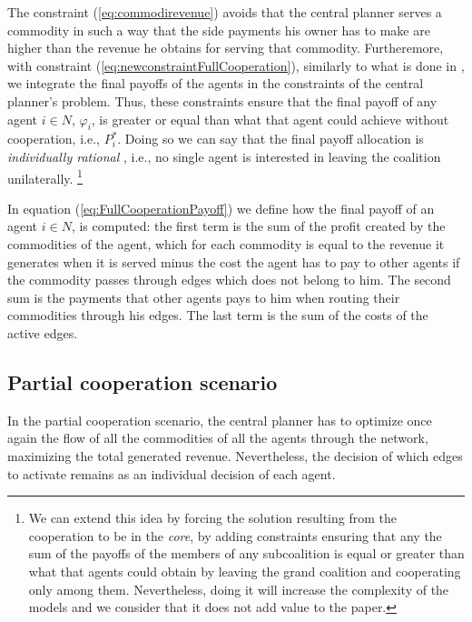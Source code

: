\documentclass[review]{elsarticle}
\begin{document}
\begin{enumerate}[(a)]
The constraint (\ref{eq:commodirevenue}) avoids that the central planner serves a commodity in such a way that the side payments his owner has to make are higher than the revenue he obtains for serving that commodity. Furtheremore, with constraint (\ref{eq:newconstraintFullCooperation}), similarly to what is done in \cite{VANOVERMEIRE2014125}, we integrate the final payoffs of the agents in the constraints of the central planner's problem. Thus, these constraints  ensure that the final payoff of any agent $i\in N$, $\varphi_i$, is greater or equal than what that agent could achieve without cooperation, i.e., $P_i^*$.  Doing so we can say that the final payoff allocation is \emph{individually rational} \cite{GONZALEZ2010}, i.e., no single agent is interested in leaving the coalition unilaterally.  \footnote{We can extend this idea by forcing the solution resulting from the cooperation to be in the \emph{core}, by adding constraints ensuring that any the sum of the payoffs of the members of any subcoalition is equal or greater than what that agents could obtain by leaving the grand coalition and cooperating only among them. Nevertheless, doing it will increase the complexity of the models and we consider that it does not add value to the paper.}
	


\end{enumerate}


In equation (\ref{eq:FullCooperationPayoff}) we define how the final payoff of an agent $i\in N$, is computed: the first term is the sum of the profit created by the commodities of the agent, which for each commodity is equal to the revenue it
generates when it is served minus the cost the agent has to pay to other agents
if the commodity passes through edges which does not belong to him. The second
sum is the payments that other agents pays to him when routing their commodities
through his edges. The last term is the sum of the costs of the active edges.


\subsection{Partial cooperation scenario}

In the partial cooperation scenario, the central planner has to optimize once
again the flow of all the commodities of all the agents through the network,
maximizing the total generated revenue. Nevertheless, the decision of which
edges to activate remains as an individual decision of each agent.
\end{document}
